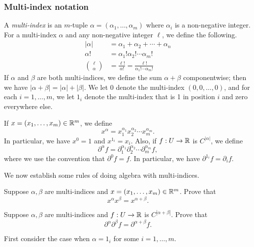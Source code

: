 \subsubsection*{Multi-index notation}

\begin{definition}  \label{multi-index}
	A \emph{multi-index} is an $m$-tuple $\alpha = (\alpha_1, \dotsc, \alpha_m)$ where $\alpha_i$ is a non-negative integer. For a multi-index $\alpha$ and any non-negative integer $\ell$, we define the following. 
	\[ \begin{aligned} |\alpha| &= \alpha_1 + \alpha_2 + \dotsb + \alpha_n \\ \alpha! &= \alpha_1! \alpha_2! \dotsb \alpha_m ! \\
	\binom{\ell}{\alpha} &= \frac{\ell!}{\alpha!} = \frac{\ell!}{\alpha_1! \dotsb \alpha_m!} \end{aligned} \]
	If $\alpha$ and $\beta$ are both multi-indices, we define the sum $\alpha + \beta$ componentwise; then we have $|\alpha + \beta| = |\alpha| + |\beta|$. We let $0$ denote the multi-index $(0, 0, \dotsc, 0)$, and for each $i = 1, \dotsc, m$, we let $1_i$ denote the multi-index that is 1 in position $i$ and zero everywhere else.
	
	If $x = (x_1, \dotsc, x_m) \in \mathbb{R}^m$, we define
	\[ x^\alpha = x_1^{\alpha_1} x_2^{\alpha_2} \dotsb x_m^{\alpha_m}. \]
	In particular, we have $x^0 = 1$ and $x^{1_i} = x_i$. 
	Also, if $f : U \to \mathbb{R}$ is $C^{|\alpha|}$, we define
	\[ \partial^\alpha f = \partial_1^{\alpha_1} \partial_2^{\alpha_2} \dotsb \partial_m^{\alpha_m} f, \]
	where we use the convention that $\partial^{0} f = f$. In particular, we have $\partial^{1_i} f = \partial_i f$. 
\end{definition}

We now establish some rules of doing algebra with multi-indices. 

\begin{exercise}
	Suppose $\alpha, \beta$ are multi-indices and $x = (x_1, \dotsc, x_m) \in \mathbb{R}^m$. Prove that \[ x^\alpha x^\beta = x^{\alpha + \beta}. \]
\end{exercise}

\begin{exercise} \label{mixed-partials-multi-index}
	Suppose $\alpha, \beta$ are multi-indices and $f : U \to \mathbb{R}$ is $C^{|\alpha + \beta|}$. Prove that \[ \partial^\alpha \partial^\beta f = \partial^{\alpha + \beta} f. \] 
	\begin{hint}
		First consider the case when $\alpha = 1_i$ for some $i = 1, \dotsc, m$. 
	\end{hint}
\end{exercise}

